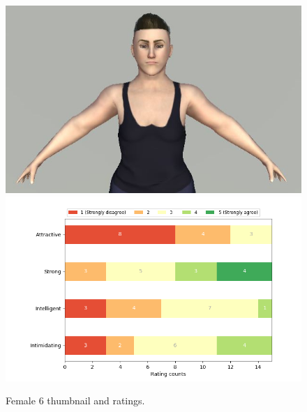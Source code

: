 \begin{figure}[H]
  \includegraphics[width=\linewidth]{Images/Females/6.JPG}
\endminipage\hfill
{}
  \includegraphics[width=\linewidth]{Survey/FRatings/avatar_f6.png}
\endminipage\hfill
\caption{Female 6 thumbnail and ratings.}
\end{figure}


